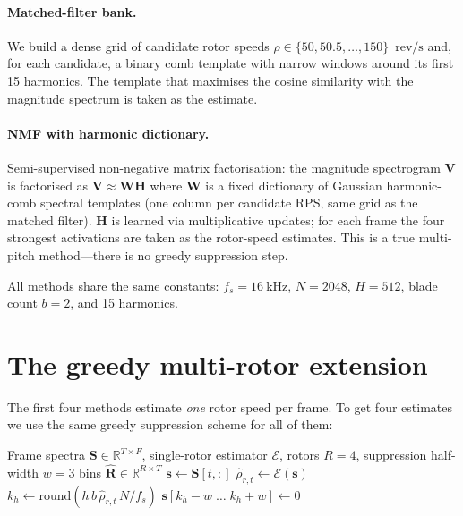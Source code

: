 \documentclass[11pt,a4paper]{article}
\newcommand{\revps}{\ensuremath{\mathrm{rev}/\mathrm{s}}}
\begin{document}
\paragraph{Matched-filter bank.} We build a dense grid of candidate rotor
speeds $\rho \in \{50, 50.5, \dots, 150\}$~\revps{} and, for each candidate,
a binary comb template with narrow windows around its first 15 harmonics.  The
template that maximises the cosine similarity with the magnitude spectrum is
taken as the estimate.

\paragraph{NMF with harmonic dictionary.}  Semi-supervised non-negative matrix
factorisation: the magnitude spectrogram $\mathbf{V}$ is factorised as
$\mathbf{V} \approx \mathbf{W}\mathbf{H}$ where $\mathbf{W}$ is a fixed
dictionary of Gaussian harmonic-comb spectral templates (one column per
candidate RPS, same grid as the matched filter).  $\mathbf{H}$ is learned via
multiplicative updates; for each frame the four strongest activations are
taken as the rotor-speed estimates.  This is a true multi-pitch method---there
is no greedy suppression step.

All methods share the same constants: $f_s = \SI{16}{\kilo\hertz}$,
$N=2048$, $H=512$, blade count $b=2$, and 15 harmonics.

\section{The greedy multi-rotor extension}

The first four methods estimate \emph{one} rotor speed per frame.  To get
four estimates we use the same greedy suppression scheme for all of them:

\begin{algorithm}[H]
\caption{Greedy multi-rotor extractor}
\label{alg:greedy}
\begin{algorithmic}[1]
\Require Frame spectra $\mathbf{S} \in \mathbb{R}^{T \times F}$,
  single-rotor estimator $\mathcal{E}$,
  rotors $R=4$,
  suppression half-width $w=3$ bins
\Ensure $\hat{\mathbf{R}} \in \mathbb{R}^{R \times T}$
  \State $\mathbf{s} \gets \mathbf{S}[t,:]$\qquad{}
    \State $\hat{\rho}_{r,t} \gets \mathcal{E}(\mathbf{s})$
      \State $k_h \gets \text{round}(h \, b \, \hat{\rho}_{r,t} \, N / f_s)$
      \State $\mathbf{s}[k_h-w \;\dots\; k_h+w] \gets 0$
    \EndFor
  \EndFor
\EndFor
\end{algorithmic}
\end{algorithm}
\end{document}

